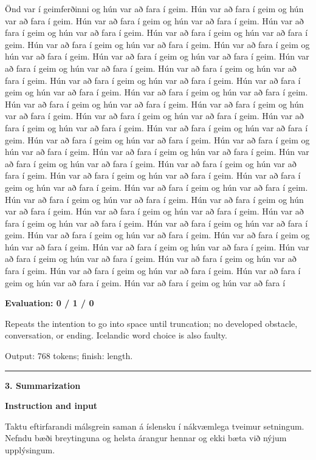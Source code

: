 \documentclass[10pt]{article}
\begin{document}
{\begin{minipage}{\textwidth}
Önd var í geimferðinni og hún var að fara í geim. Hún var að fara í geim og hún var að fara í geim. Hún var að fara í geim og hún var að fara í geim. Hún var að fara í geim og hún var að fara í geim. Hún var að fara í geim og hún var að fara í geim. Hún var að fara í geim og hún var að fara í geim. Hún var að fara í geim og hún var að fara í geim. Hún var að fara í geim og hún var að fara í geim. Hún var að fara í geim og hún var að fara í geim. Hún var að fara í geim og hún var að fara í geim. Hún var að fara í geim og hún var að fara í geim. Hún var að fara í geim og hún var að fara í geim. Hún var að fara í geim og hún var að fara í geim. Hún var að fara í geim og hún var að fara í geim. Hún var að fara í geim og hún var að fara í geim. Hún var að fara í geim og hún var að fara í geim. Hún var að fara í geim og hún var að fara í geim. Hún var að fara í geim og hún var að fara í geim. Hún var að fara í geim og hún var að fara í geim. Hún var að fara í geim og hún var að fara í geim. Hún var að fara í geim og hún var að fara í geim. Hún var að fara í geim og hún var að fara í geim. Hún var að fara í geim og hún var að fara í geim. Hún var að fara í geim og hún var að fara í geim. Hún var að fara í geim og hún var að fara í geim. Hún var að fara í geim og hún var að fara í geim. Hún var að fara í geim og hún var að fara í geim. Hún var að fara í geim og hún var að fara í geim. Hún var að fara í geim og hún var að fara í geim. Hún var að fara í geim og hún var að fara í geim. Hún var að fara í geim og hún var að fara í geim. Hún var að fara í geim og hún var að fara í geim. Hún var að fara í geim og hún var að fara í geim. Hún var að fara í geim og hún var að fara í geim. Hún var að fara í geim og hún var að fara í geim. Hún var að fara í geim og hún var að fara í geim. Hún var að fara í geim og hún var að fara í geim. Hún var að fara í geim og hún var að fara í geim. Hún var að fara í geim og hún var að fara í\par\smallskip
\textbf{Evaluation: 0 / 1 / 0}\par Repeats the intention to go into space until truncation; no developed obstacle, conversation, or ending. Icelandic word choice is also faulty.
\par {\color{gray} Output: 768 tokens; finish: length.}\par
\medskip\hrule\smallskip
{\bfseries 3. Summarization}\par\smallskip
\textbf{Instruction and input}\par Taktu eftirfarandi málsgrein saman á íslensku í nákvæmlega tveimur setningum. Nefndu bæði breytinguna og helsta árangur hennar og ekki bæta við nýjum upplýsingum.

\end{minipage}}
\end{document}
